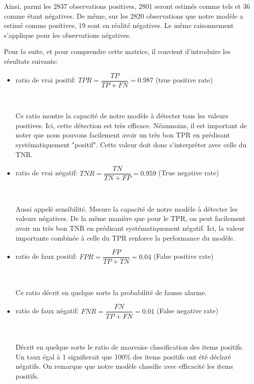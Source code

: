 \documentclass[a4paper]{report}
\begin{document}
Ainsi, parmi les 2837 observations positives, 2801 seront estimés comme tels et 36 comme étant négatives. De même, sur les 2820 observations que notre modèle a estimé comme positives, 19 sont en réalité négatives. Le même raisonnement s'applique pour les observations négatives. 


Pour la suite, et pour comprendre cette matrice, il convient d'introduire les résultats suivants:

\begin{itemize}\setlength{\itemsep}{1.5mm}
\item ratio de vrai positif: $TPR=\dfrac{TP}{TP+FN}=0.987$  (true positive rate)

~\par

Ce ratio montre la capacité de notre modèle à détecter tous les valeurs positives. Ici, cette détection est très efficace. Néanmoins, il est important de noter que nous pouvons facilement avoir un très bon TPR en prédisant systématiquement "positif". Cette valeur doit donc s'interpréter avec celle du TNR. 

\item ratio de vrai négatif: $TNR=\dfrac{TN}{TN+FP} = 0.959$ (True negative rate)

~\par

Aussi appelé sensibilité. Mesure la capacité de notre modèle à détecter les valeurs négatives. De la même manière que pour le TPR, on peut facilement avoir un très bon TNR en prédisant systématiquement négatif. Ici, la valeur importante combinée à celle du TPR renforce la performance du modèle.

\item ratio de faux positif: $FPR=\dfrac{FP}{TP+TN}=0.04$ (False positive rate)

~\par

Ce ratio décrit en quelque sorte la probabilité de fausse alarme. 

\item ratio de faux négatif: $FNR=\dfrac{FN}{TP+FN}=0.01 $ (False negative rate)

~\par

Décrit en quelque sorte le ratio de mauvaise classification des items positifs. Un taux égal à 1 signifierait que 100\% des items positifs ont été déclaré négatifs. On remarque que notre modèle classifie avec efficacité les items positifs.


\end{itemize}
\end{document}
